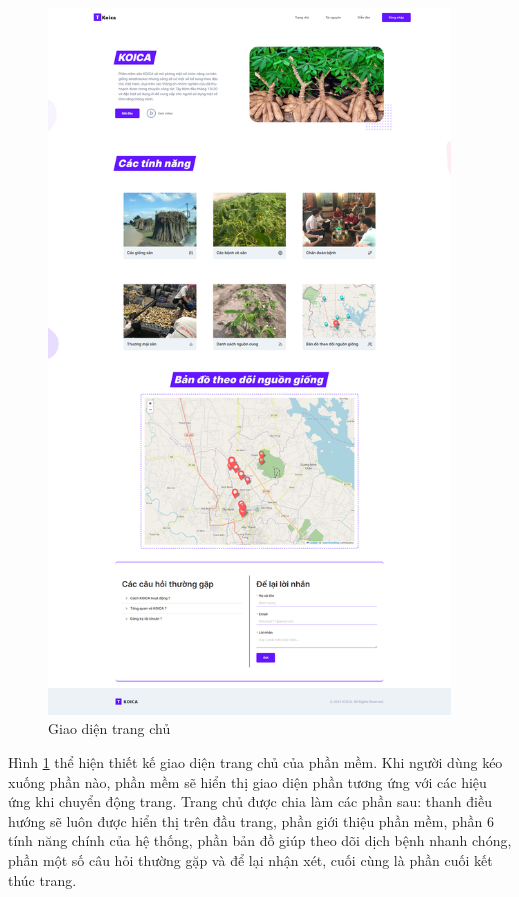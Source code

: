 \documentclass[./../main.tex]{subfiles}
\begin{document}
\begin{figure}[H]
\centering
    \includegraphics[width=0.95\textwidth,height=0.95\textheight,keepaspectratio]{./img/kltn_homepage.png}
    \caption{Giao diện trang chủ}
    \label{ui:kltn_homepage}
\end{figure}
Hình \ref{ui:kltn_homepage} thể hiện thiết kế giao diện trang chủ của phần mềm. Khi người dùng kéo xuống phần nào, phần mềm sẽ hiển thị giao diện phần tương ứng với các hiệu ứng khi chuyển động trang. Trang chủ được chia làm các phần sau: thanh điều hướng sẽ luôn được hiển thị trên đầu trang, phần giới thiệu phần mềm, phần 6 tính năng chính của hệ thống, phần bản đồ giúp theo dõi dịch bệnh nhanh chóng, phần một số câu hỏi thường gặp và để lại nhận xét, cuối cùng là phần cuối kết thúc trang.
\end{document}
